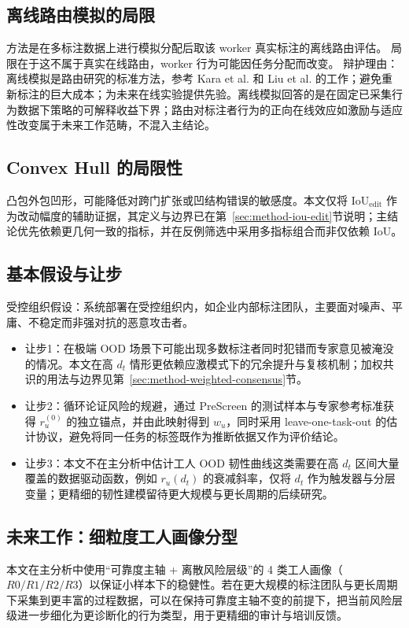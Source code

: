 \subsection{离线路由模拟的局限}
方法是在多标注数据上进行模拟分配后取该 worker 真实标注的离线路由评估。
局限在于这不属于真实在线路由，worker 行为可能因任务分配而改变。
辩护理由：离线模拟是路由研究的标准方法，参考 Kara et al. 和 Liu et al. 的工作；避免重新标注的巨大成本；为未来在线实验提供先验。离线模拟回答的是在固定已采集行为数据下策略的可解释收益下界；路由对标注者行为的正向在线效应如激励与适应性改变属于未来工作范畴，不混入主结论。
\subsection{Convex Hull 的局限性}
凸包外包凹形，可能降低对跨门扩张或凹结构错误的敏感度。本文仅将 $\mathrm{IoU}_{\mathrm{edit}}$ 作为改动幅度的辅助证据，其定义与边界已在第~\ref{sec:method-iou-edit}节说明；主结论优先依赖更几何一致的指标，并在反例筛选中采用多指标组合而非仅依赖 IoU。

\subsection{基本假设与让步}\label{sec:disc-assumptions}
受控组织假设：系统部署在受控组织内，如企业内部标注团队，主要面对噪声、平庸、不稳定而非强对抗的恶意攻击者。
\begin{itemize}
    \item 让步1：在极端 OOD 场景下可能出现多数标注者同时犯错而专家意见被淹没的情况。本文在高 $d_t$ 情形更依赖应激模式下的冗余提升与复核机制；加权共识的用法与边界见第~\ref{sec:method-weighted-consensus}节。
	\item 让步2：循环论证风险的规避，通过 PreScreen 的测试样本与专家参考标准获得 $r_{u}^{(0)}$ 的独立锚点，并由此映射得到 $w_u$，同时采用 leave-one-task-out 的估计协议，避免将同一任务的标签既作为推断依据又作为评价结论。
    \item 让步3：本文不在主分析中估计工人 OOD 韧性曲线这类需要在高 $d_{t}$ 区间大量覆盖的数据驱动函数，例如 $r_{u}(d_{t})$ 的衰减斜率，仅将 $d_{t}$ 作为触发器与分层变量；更精细的韧性建模留待更大规模与更长周期的后续研究。

\end{itemize}

\subsection{未来工作：细粒度工人画像分型}
本文在主分析中使用“可靠度主轴 + 离散风险层级”的 4 类工人画像（$R0/R1/R2/R3$）以保证小样本下的稳健性。若在更大规模的标注团队与更长周期下采集到更丰富的过程数据，可以在保持可靠度主轴不变的前提下，把当前风险层级进一步细化为更诊断化的行为类型，用于更精细的审计与培训反馈。

